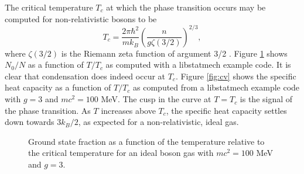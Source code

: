 \documentclass[pdftex]{article}    %
\begin{document}
The critical temperature $T_c$ at which the phase transition occurs may
be computed for non-relativistic bosons to be
\[
T_c = \frac{2\pi\hbar^2}{mk_B}\left(\frac{n}{g\zeta(3/2)}\right)^{2/3},
\]
where $\zeta(3/2)$ is the Riemann zeta function of argument 3/2
\cite{PitaevskiiAndStringari}.  Figure \ref{fig:n_tc} shows $N_0 / N$ as
a function of $T/T_c$ as computed with a libstatmech example code.  It
is clear that condensation does indeed occur at $T_c$.  Figure \ref{fig:cv}
shows the specific heat capacity as a function of $T/T_c$ as computed from
a libstatmech example code with $g = 3$ and $mc^2 = 100$ MeV.
The cusp in the curve at $T = T_c$ is the signal of the phase transition.
As $T$ increases above $T_c$, the specific heat capacity settles down
towards $3k_B/2$, as expected for a non-relativistic, ideal gas.

\begin{figure}[htp]
\centering
{}
\caption{Ground state fraction as a function of the temperature relative
  to the critical temperature for an ideal boson gas with $mc^2 = 100$ MeV
  and $g = 3$.}
\label{fig:n_tc}
\end{figure}
\end{document}
